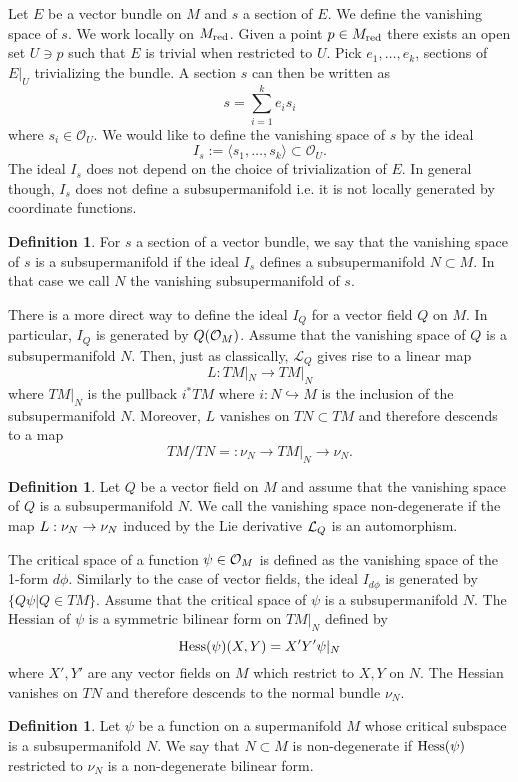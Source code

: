 \documentclass[11pt]{amsart}
\numberwithin{equation}{section}
\numberwithin{figure}{section}
\theoremstyle{plain}
\theoremstyle{definition}
\newtheorem{defn}[thm]{Definition}
\theoremstyle{remark}
\begin{document}
Let $E$ be a vector bundle on $M$ and $s$ a section of $E$. We
define the vanishing space of $s$. We work locally on $M_{\mathrm{red}}$.
Given a point $p\in M_{\mathrm{red}}$ there exists an open set $U\ni p$
such that $E$ is trivial when restricted to $U$. Pick $e_{1},\dots,e_{k}$,
sections of $E|_{U}$ trivializing the bundle. A section $s$ can
then be written as
\[
s=\sum_{i=1}^{k}e_{i}s_{i}
\]
where $s_{i}\in\mathcal{O}_{U}$. We would like to define the vanishing
space of $s$ by the ideal 
\[
I_{s}:=\langle s_{1},\dots,s_{k}\rangle\subset\mathcal{O}_{U}.
\]
The ideal $I_{s}$ does not depend on the choice of trivialization
of $E$. In general though, $I_{s}$ does not define a subsupermanifold
i.e. it is not locally generated by coordinate functions. 
\begin{defn}
For $s$ a section of a vector bundle, we say that the vanishing space
of $s$ is a subsupermanifold if the ideal $I_{s}$ defines a subsupermanifold
$N\subset M$. In that case we call $N$ the vanishing subsupermanifold
of $s$.
\end{defn}
There is a more direct way to define the ideal $I_{Q}$ for a vector
field $Q$ on $M$. In particular, $I_{Q}$ is generated by $Q(\mathcal{O}_{M})$.
Assume that the vanishing space of $Q$ is a subsupermanifold $N$.
Then, just as classically, $\mathcal{L}_{Q}$ gives rise to a linear
map
\[
L:TM|_{N}\rightarrow TM|_{N}
\]
where $TM|_{N}$ is the pullback $i^{*}TM$ where $i:N\hookrightarrow M$
is the inclusion of the subsupermanifold $N$. Moreover, $L$ vanishes
on $TN\subset TM$ and therefore descends to a map 
\[
TM/TN=:\nu_{N}\rightarrow TM|_{N}\rightarrow\nu_{N}.
\]

\begin{defn}
Let $Q$ be a vector field on $M$ and assume that the vanishing space
of $Q$ is a subsupermanifold $N.$ We call the vanishing space non-degenerate
if the map $L:\nu_{N}\rightarrow\nu_{N}$ induced by the Lie derivative $\mathcal{L}_{Q}$
is an automorphism. 
\end{defn}
The critical space of a function $\psi\in\mathcal{O}_{M}$ is defined as the
vanishing space of the 1-form $d\phi$. Similarly to the case of vector
fields, the ideal $I_{d\phi}$ is generated by $\{Q\psi|Q\in TM\}$.
Assume that the critical space of $\psi$ is a subsupermanifold $N$.
The Hessian of $\psi$ is a symmetric bilinear form on $TM|_{N}$
defined by 
\[
\mathrm{Hess}(\psi)(X,Y)=X'Y'\psi|_{N}
\]
where $X',Y'$ are any vector fields on $M$ which restrict to $X,Y$
on $N$. The Hessian vanishes on $TN$ and therefore descends to the
normal bundle $\nu_{N}$.
\begin{defn}
Let $\psi$ be a function on a supermanifold $M$ whose critical subspace
is a subsupermanifold $N$. We say that $N\subset M$ is non-degenerate
if $\mathrm{Hess}(\psi)$ restricted to $\nu_{N}$ is a non-degenerate bilinear
form.
\end{defn}
\end{document}
